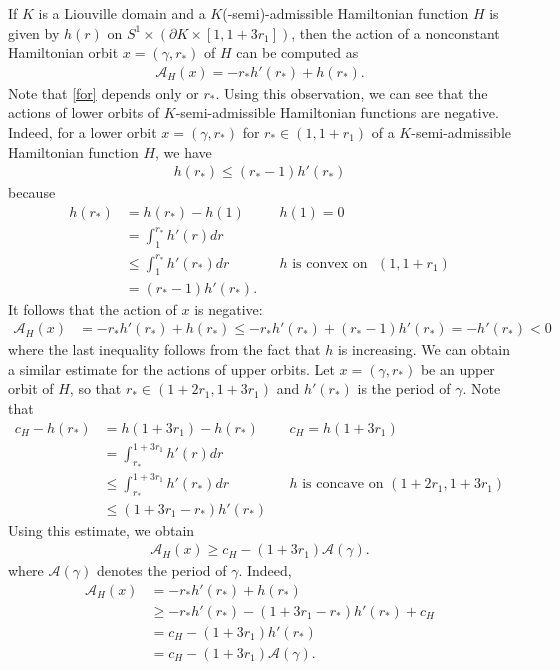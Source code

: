 \documentclass[12pt]{amsart}
\theoremstyle{definition}
\begin{document}
If $K$ is a Liouville domain and a $K$(-semi)-admissible Hamiltonian function $H$ is given by $h(r)$ on $S^1 \times\left( \partial K \times [1,1+3r_1] \right) $, then the action of a nonconstant Hamiltonian orbit $x=(\gamma,r_*)$ of $H$ can be computed as
\begin{align}\label{for}
    \mathcal{A}_H(x) = - r_*h'(r_* ) + h (r_*). 
\end{align}
Note that \eqref{for} depends only or $r_*$. Using this observation, we can see that the actions of lower orbits of $K$-semi-admissible Hamiltonian functions are negative. Indeed, for a lower orbit $x=(\gamma,r_*)$ for $r_* \in (1,1+r_1)$ of a $K$-semi-admissible Hamiltonian function $H$, we have
\begin{align}\label{lo}
    h(r_*) \leq (r_*-1)h'(r_*)
\end{align}
because
\begin{align*}
    h(r_*)& = h(r_*) - h(1) &&h(1) = 0\\
    &= \int_{1}^{r_*} h'(r)d r\\
    &\leq \int_{1}^{r_*} h'(r_*)d r &&h\,\,\textrm{is convex on }\,\,(1,1+r_1) \\
    &= (r_*-1)h'(r_*). 
\end{align*}
It follows that the action of $x$ is negative:
\begin{align*}
    \mathcal{A}_H(x) &= - r_*h'(r_* ) + h (r_*) \leq - r_*h'(r_* ) + (r_*-1)h'(r_*) = -h'(r_*) <0
\end{align*}
where the last inequality follows from the fact that $h$ is increasing. We can obtain a similar estimate for the actions of upper orbits. Let $x=(\gamma,r_*)$ be an upper orbit of $H$, so that $r_* \in (1+2r_1,1+3r_1)$ and $h'(r_*)$ is the period of $\gamma$. Note that  
\begin{align*}
    c_H -h(r_*)& = h(1+3r_1) - h(r_*)&&c_H=h(1+3r_1)\\
    &=\int_{r_*}^{1+3r_1} h'(r) dr \\
    &\leq \int_{r_*}^{1+3r_1} h'(r_*) dr &&h\,\,\textrm{is concave on}\,\,(1+2r_1, 1+3r_1)\\
    & \leq (1+3r_1 - r_*)h'(r_*)
\end{align*}
Using this estimate, we obtain
\begin{align}\label{ua}
    \mathcal{A}_H(x) \geq c_H-(1+3r_1) \mathcal{A}(\gamma).
\end{align}
where $\mathcal{A}(\gamma)$ denotes the period of $\gamma$. Indeed, 
\begin{align*}
    \mathcal{A}_H(x) &= - r_*h'(r_* ) + h (r_*)\nonumber \\&\geq - r_*h'(r_* ) -(1+3r_1 - r_*)h'(r_*) +c_H\nonumber\\& = c_H-(1+3r_1)h'(r_*) \nonumber\\&=c_H-(1+3r_1) \mathcal{A}(\gamma). 
    \end{align*}
\end{document}
